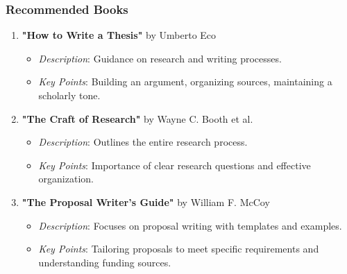 \documentclass[aspectratio=169]{beamer}
\begin{document}
\begin{frame}[fragile]
    \frametitle{Recommended Books}
    \begin{enumerate}
        \item \textbf{"How to Write a Thesis"} by Umberto Eco
            \begin{itemize}
                \item \textit{Description}: Guidance on research and writing processes.
                \item \textit{Key Points}: Building an argument, organizing sources, maintaining a scholarly tone.
            \end{itemize}
        \item \textbf{"The Craft of Research"} by Wayne C. Booth et al.
            \begin{itemize}
                \item \textit{Description}: Outlines the entire research process.
                \item \textit{Key Points}: Importance of clear research questions and effective organization.
            \end{itemize}
        \item \textbf{"The Proposal Writer's Guide"} by William F. McCoy
            \begin{itemize}
                \item \textit{Description}: Focuses on proposal writing with templates and examples.
                \item \textit{Key Points}: Tailoring proposals to meet specific requirements and understanding funding sources.
            \end{itemize}
    \end{enumerate}
\end{frame}
\end{document}
